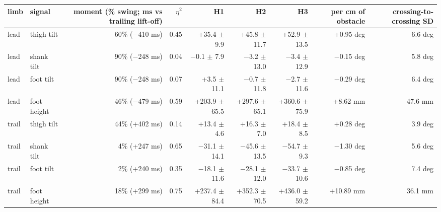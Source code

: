 \begin{adjustbox}{max width=\textwidth}
{\scriptsize
\begin{tabular}{llrrrrrrr}
\toprule
\textbf{limb} & \textbf{signal} & \textbf{moment (\% swing; ms vs trailing lift-off)} & \textbf{$\eta^2$} & \textbf{H1} & \textbf{H2} & \textbf{H3} & \textbf{per cm of obstacle} & \textbf{crossing-to-crossing SD} \\
\midrule
lead & thigh tilt & 60\% ($-$410 ms) & 0.45 & +35.4 $\pm$ 9.9 & +45.8 $\pm$ 11.7 & +52.9 $\pm$ 13.5 & +0.95 deg & 6.6 deg \\
lead & shank tilt & 90\% ($-$248 ms) & 0.04 & $-$0.1 $\pm$ 7.9 & $-$3.2 $\pm$ 13.0 & $-$3.4 $\pm$ 12.9 & $-$0.15 deg & 5.8 deg \\
lead & foot tilt & 90\% ($-$248 ms) & 0.07 & +3.5 $\pm$ 11.1 & $-$0.7 $\pm$ 11.8 & $-$2.7 $\pm$ 11.6 & $-$0.29 deg & 6.4 deg \\
lead & foot height & 46\% ($-$479 ms) & 0.59 & +203.9 $\pm$ 65.5 & +297.6 $\pm$ 65.1 & +360.6 $\pm$ 75.9 & +8.62 mm & 47.6 mm \\
trail & thigh tilt & 44\% (+402 ms) & 0.14 & +13.4 $\pm$ 4.6 & +16.3 $\pm$ 7.0 & +18.4 $\pm$ 8.5 & +0.28 deg & 3.9 deg \\
trail & shank tilt & 4\% (+247 ms) & 0.65 & $-$31.1 $\pm$ 14.1 & $-$45.6 $\pm$ 13.5 & $-$54.7 $\pm$ 9.3 & $-$1.30 deg & 5.6 deg \\
trail & foot tilt & 2\% (+240 ms) & 0.35 & $-$18.1 $\pm$ 11.6 & $-$28.1 $\pm$ 12.0 & $-$33.7 $\pm$ 10.6 & $-$0.85 deg & 7.4 deg \\
trail & foot height & 18\% (+299 ms) & 0.75 & +237.4 $\pm$ 84.4 & +352.3 $\pm$ 70.5 & +436.0 $\pm$ 59.2 & +10.89 mm & 36.1 mm \\
\bottomrule
\end{tabular}
}
\end{adjustbox}

